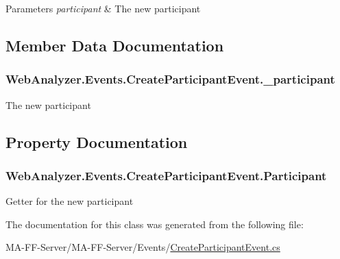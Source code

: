 \begin{DoxyParams}{Parameters}
{\em participant} & The new participant\\
\hline
\end{DoxyParams}


\subsection{Member Data Documentation}
\hypertarget{class_web_analyzer_1_1_events_1_1_create_participant_event_aab15f3032d370af1d8518b7beb0cdfe4}{}
\subsubsection[{\+\_\+participant}]{ Web\+Analyzer.\+Events.\+Create\+Participant\+Event.\+\_\+participant\hspace{0.3cm}{\ttfamily [private]}}\label{class_web_analyzer_1_1_events_1_1_create_participant_event_aab15f3032d370af1d8518b7beb0cdfe4}


The new participant 



\subsection{Property Documentation}
\hypertarget{class_web_analyzer_1_1_events_1_1_create_participant_event_a33ceb02517db8c73eac1753aedc7823c}{}
\subsubsection[{Participant}]{ Web\+Analyzer.\+Events.\+Create\+Participant\+Event.\+Participant\hspace{0.3cm}{\ttfamily [get]}}\label{class_web_analyzer_1_1_events_1_1_create_participant_event_a33ceb02517db8c73eac1753aedc7823c}


Getter for the new participant 



The documentation for this class was generated from the following file\+:\begin{DoxyCompactItemize}
\item 
M\+A-\/\+F\+F-\/\+Server/\+M\+A-\/\+F\+F-\/\+Server/\+Events/\hyperlink{_create_participant_event_8cs}{Create\+Participant\+Event.\+cs}\end{DoxyCompactItemize}
